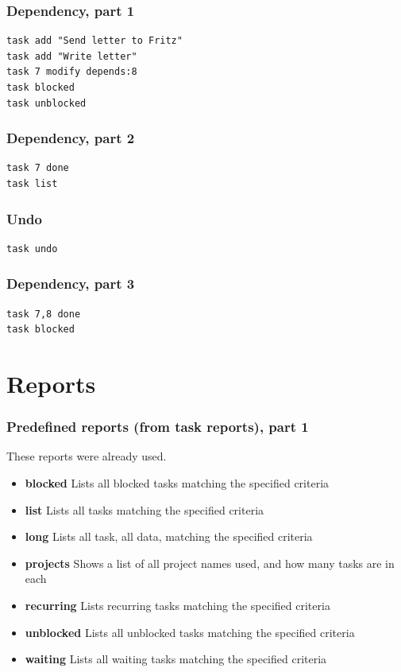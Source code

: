 \documentclass[t,handout]{beamer}
\begin{document}
\begin{frame}[fragile]\frametitle{Dependency, part 1}
    \vfill
    \begin{lstlisting}
task add "Send letter to Fritz"
task add "Write letter"
task 7 modify depends:8
task blocked
task unblocked
\end{lstlisting}
\end{frame}

\begin{frame}[fragile]\frametitle{Dependency, part 2}
    \vfill
    \begin{lstlisting}
task 7 done
task list
\end{lstlisting}
\end{frame}

\begin{frame}[fragile]\frametitle{Undo}
    \vfill
    \begin{lstlisting}
task undo
\end{lstlisting}
\end{frame}

\begin{frame}[fragile]\frametitle{Dependency, part 3}
    \vfill
    \begin{lstlisting}
task 7,8 done
task blocked
\end{lstlisting}
\end{frame}

\section{Reports}

\begin{frame}[fragile]\frametitle{Predefined reports (from task reports), part 1}
    These reports were already used.

    \begin{itemize}
        \item \textbf{blocked}          Lists all blocked tasks matching the specified criteria
        \item \textbf{list}             Lists all tasks matching the specified criteria
        \item \textbf{long}             Lists all task, all data, matching the specified criteria
        \item \textbf{projects}         Shows a list of all project names used, and how many tasks are in each
        \item \textbf{recurring}        Lists recurring tasks matching the specified criteria
        \item \textbf{unblocked}        Lists all unblocked tasks matching the specified criteria
        \item \textbf{waiting}          Lists all waiting tasks matching the specified criteria
    \end{itemize}
\end{frame}
\end{document}
